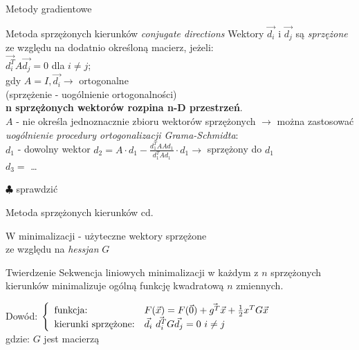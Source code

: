   \begin{frame}{Metody gradientowe}

 	\begin{block}{Metoda sprzężonych kierunków \emph{conjugate directions}}
 	   Wektory $\vec{d_i}$ i $\vec{d_j}$ są \emph{sprzężone} ze względu na dodatnio określoną macierz, jeżeli:
 	   \\$\vec{d_i^T} A\vec{d_j} = 0$ dla $i \neq j$;
 	   \\gdy $A = I, \vec{d_i} \rightarrow$ ortogonalne
 	   \\(sprzężenie - uogólnienie ortogonalności)
 	   \\ \textbf{n sprzężonych wektorów rozpina n-D przestrzeń}.
 	   \\$A$ - nie określa jednoznacznie zbioru wektorów sprzężonych $\rightarrow$ można zastosować
 	   \emph{uogólnienie procedury ortogonalizacji Grama-Schmidta}:
 	   \\$d_1$ - dowolny wektor $d_2 = A \cdot d_1 - \frac{d_1^T A A d_1}{d_1^T A d_1} \cdot d_1 \rightarrow$ sprzężony do $d_1$
 	   \\$d_3 =$ \ldots
 	   \begin{flushright}
 	      $\clubsuit$ sprawdzić
 	   \end{flushright}
 	\end{block}

  \end{frame}

  \begin{frame}{Metoda sprzężonych kierunków cd.}

    W minimalizacji - użyteczne wektory sprzężone
    \\ze względu na \emph{hessjan} $G$
 	\begin{block}{Twierdzenie}
 	   Sekwencja liniowych minimalizacji w każdym z $n$ sprzężonych kierunków minimalizuje ogólną funkcję kwadratową $n$ zmiennych.
 	\end{block}
 	\begin{block}{Dowód:}
 	   $\left\{
        \begin{array}{l l}
          \text{funkcja:} & F(\vec{x}) = F(\vec{0}) + \vec{g^T} \vec{x} + \frac{1}{2} x^T G \vec{x} \\
          \text{kierunki sprzężone:} & \vec{d_i} \ \vec{d_i^T} G \vec{d_j} = 0 \ i \neq j
	    \end{array}
	  \right.$
	  \\gdzie: $G$ jest macierzą
 	\end{block}

  \end{frame}

